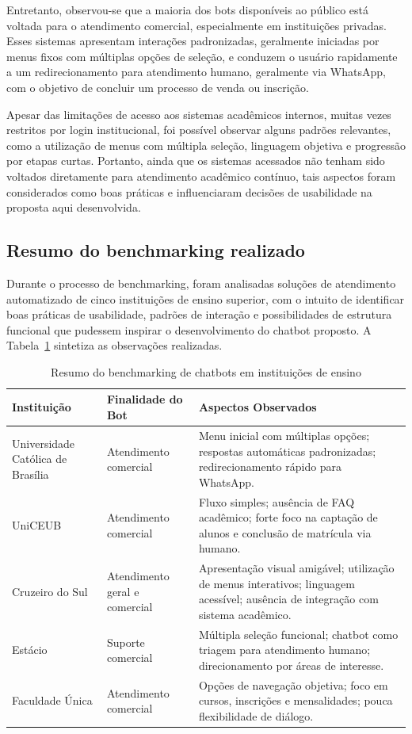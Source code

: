 Entretanto, observou-se que a maioria dos bots disponíveis ao público está voltada para o atendimento comercial, especialmente em instituições privadas. Esses sistemas apresentam interações padronizadas, geralmente iniciadas por menus fixos com múltiplas opções de seleção, e conduzem o usuário rapidamente a um redirecionamento para atendimento humano, geralmente via WhatsApp, com o objetivo de concluir um processo de venda ou inscrição.

Apesar das limitações de acesso aos sistemas acadêmicos internos, muitas vezes restritos por login institucional, foi possível observar alguns padrões relevantes, como a utilização de menus com múltipla seleção, linguagem objetiva e progressão por etapas curtas. Portanto, ainda que os sistemas acessados não tenham sido voltados diretamente para atendimento acadêmico contínuo, tais aspectos foram considerados como boas práticas e influenciaram decisões de usabilidade na proposta aqui desenvolvida.

\subsection{Resumo do benchmarking realizado}

Durante o processo de benchmarking, foram analisadas soluções de atendimento automatizado de cinco instituições de ensino superior, com o intuito de identificar boas práticas de usabilidade, padrões de interação e possibilidades de estrutura funcional que pudessem inspirar o desenvolvimento do chatbot proposto. A Tabela~\ref{tab:benchmarking} sintetiza as observações realizadas.

\begin{table}[htbp]
\centering
\caption{Resumo do benchmarking de chatbots em instituições de ensino}
\label{tab:benchmarking}
\begin{tabular}{|p{3.5cm}|p{4.2cm}|p{5.8cm}|}
\hline
\textbf{Instituição} & \textbf{Finalidade do Bot} & \textbf{Aspectos Observados} \\ \hline
Universidade Católica de Brasília & Atendimento comercial & Menu inicial com múltiplas opções; respostas automáticas padronizadas; redirecionamento rápido para WhatsApp. \\ \hline
UniCEUB & Atendimento comercial & Fluxo simples; ausência de FAQ acadêmico; forte foco na captação de alunos e conclusão de matrícula via humano. \\ \hline
Cruzeiro do Sul & Atendimento geral e comercial & Apresentação visual amigável; utilização de menus interativos; linguagem acessível; ausência de integração com sistema acadêmico. \\ \hline
Estácio & Suporte comercial & Múltipla seleção funcional; chatbot como triagem para atendimento humano; direcionamento por áreas de interesse. \\ \hline
Faculdade Única & Atendimento comercial & Opções de navegação objetiva; foco em cursos, inscrições e mensalidades; pouca flexibilidade de diálogo. \\ \hline
\end{tabular}
\end{table}

